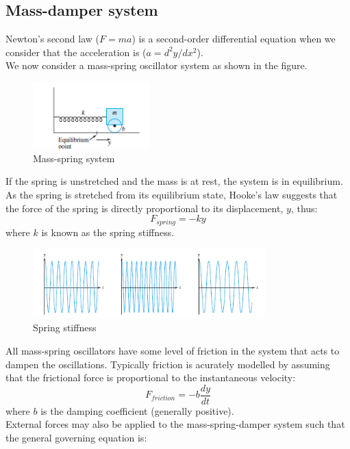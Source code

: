 \subsection{Mass-damper system}
Newton's second law ($F=ma$) is a second-order differential equation when we consider that the acceleration is ($a=d^2 y/dx^2$). \\

We now consider a mass-spring oscillator system
as shown in the figure.
\begin{figure}
\centering
\includegraphics[width=0.4\textwidth]{figs/MassSpring.png}
\caption{Mass-spring system} 
\end{figure}
If the spring is unstretched and the mass is at rest, the system is in equilibrium. As the spring is stretched from its equilibrium state, Hooke's law suggests that the force of the spring is directly proportional to its displacement, $y$, thus:
\begin{equation*}
F_{spring}=-ky
\end{equation*}
where $k$ is known as the spring stiffness.\\
\begin{figure}
\centering
\includegraphics[width=0.8\textwidth]{figs/springStiff.png}
\caption{Spring stiffness} 
\end{figure}
All mass-spring oscillators have some level of friction in the system that acts to dampen the oscillations. Typically friction is acurately modelled by assuming that the frictional force is proportional to the instantaneous velocity:
\begin{equation*}
F_{friction}=-b\frac{dy}{dt}
\end{equation*}
where $b$ is the damping coefficient (generally positive).\\
External forces may also be applied to the mass-spring-damper system such that the general governing equation is:

